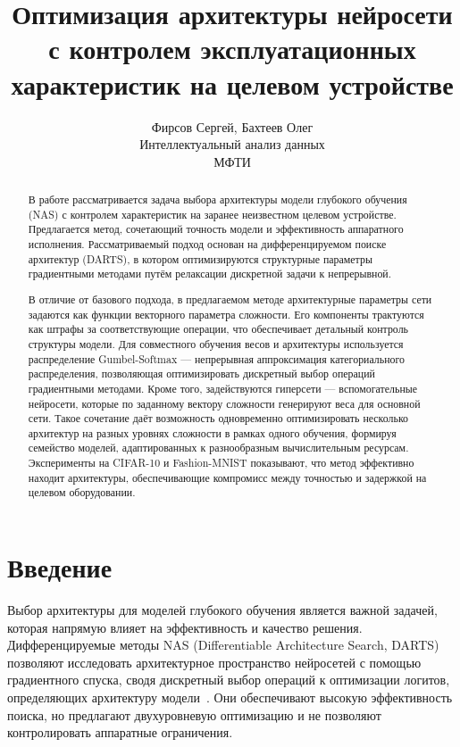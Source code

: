 \documentclass{article}
\title{Оптимизация архитектуры нейросети с контролем эксплуатационных характеристик на целевом устройстве}
\author{Фирсов Сергей, Бахтеев Олег\\ Интеллектуальный анализ данных\\МФТИ}
\begin{document}
\maketitle

\begin{abstract}
В работе рассматривается задача выбора архитектуры модели глубокого обучения (NAS) с контролем характеристик на заранее неизвестном целевом устройстве. Предлагается метод, сочетающий точность модели и эффективность аппаратного исполнения. Рассматриваемый подход основан на дифференцируемом поиске архитектур (DARTS), в котором оптимизируются структурные параметры градиентными методами путём релаксации дискретной задачи к непрерывной. %

В отличие от базового подхода, в предлагаемом методе архитектурные параметры сети задаются как функции векторного параметра сложности. Его компоненты трактуются как штрафы за соответствующие операции, что обеспечивает детальный контроль структуры модели. Для совместного обучения весов и архитектуры используется распределение Gumbel-Softmax --- непрерывная аппроксимация категориального распределения, позволяющая  оптимизировать дискретный выбор операций градиентными методами. Кроме того, задействуются гиперсети --- вспомогательные нейросети, которые по заданному вектору сложности генерируют веса для основной сети. Такое сочетание даёт возможность одновременно оптимизировать несколько архитектур на разных уровнях сложности в рамках одного обучения, формируя семейство моделей, адаптированных к разнообразным вычислительным ресурсам. Эксперименты на CIFAR-10 и Fashion-MNIST показывают, что метод эффективно находит архитектуры, обеспечивающие компромисс между точностью и задержкой на целевом оборудовании.

\end{abstract}

\section{Введение}

Выбор архитектуры для моделей глубокого обучения является важной задачей, которая напрямую влияет на эффективность и качество решения. Дифференцируемые методы NAS (Differentiable Architecture Search, DARTS) позволяют исследовать архитектурное пространство нейросетей с помощью градиентного спуска, сводя дискретный выбор операций к оптимизации логитов, определяющих архитектуру модели~\cite{liu2019darts,Chen2019SNAS}. Они обеспечивают высокую эффективность поиска, но предлагают двухуровневую оптимизацию и не позволяют контролировать аппаратные ограничения. %
\end{document}
